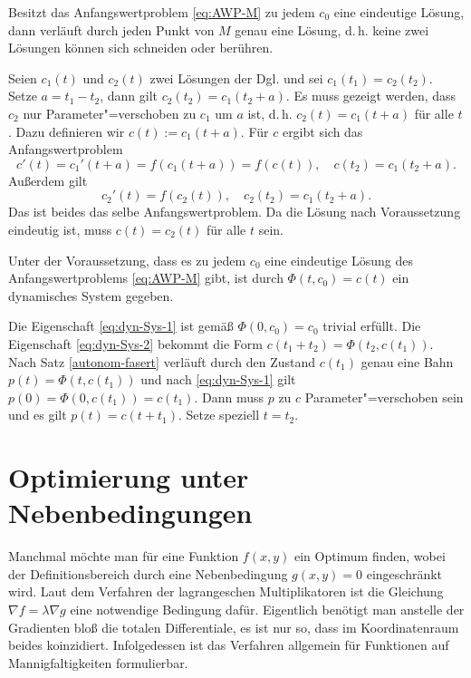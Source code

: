 \begin{theorem}\label{autonom-fasert}
Besitzt das Anfangswertproblem \eqref{eq:AWP-M} zu jedem $c_0$ eine
eindeutige Lösung, dann verläuft durch jeden Punkt von $M$ genau
eine Lösung, d.\,h. keine zwei Lösungen können sich schneiden
oder berühren.
\end{theorem}
\noindent{}
Seien $c_1(t)$ und $c_2(t)$ zwei Lösungen der Dgl. und sei
$c_1(t_1)=c_2(t_2)$. Setze $a=t_1-t_2$, dann gilt $c_2(t_2)=c_1(t_2+a)$.
Es muss gezeigt werden, dass $c_2$ nur Parameter"=verschoben
zu $c_1$ um $a$ ist, d.\,h. $c_2(t)=c_1(t+a)$ für alle $t$. Dazu
definieren wir $c(t):=c_1(t+a)$. Für $c$ ergibt sich das
Anfangswertproblem
\begin{equation}
c'(t) = c_1'(t+a) = f(c_1(t+a)) = f(c(t)),\quad c(t_2)=c_1(t_2+a).
\end{equation}
Außerdem gilt
\begin{equation}
c_2'(t) = f(c_2(t)), \quad c_2(t_2)=c_1(t_2+a).
\end{equation}
Das ist beides das selbe Anfangswertproblem. Da die Lösung nach
Voraussetzung eindeutig ist, muss $c(t)=c_2(t)$
für alle $t$ sein.\;\qedsymbol

\begin{theorem}
Unter der Voraussetzung, dass es zu jedem $c_0$ eine eindeutige
Lösung des Anfangswertproblems \eqref{eq:AWP-M} gibt, ist durch
$\Phi(t,c_0)=c(t)$ ein dynamisches System gegeben.
\end{theorem}
\noindent{}
Die Eigenschaft \eqref{eq:dyn-Sys-1} ist gemäß $\Phi(0,c_0)=c_0$
trivial erfüllt. Die Eigenschaft \eqref{eq:dyn-Sys-2} bekommt
die Form $c(t_1+t_2)=\Phi(t_2,c(t_1))$. Nach Satz
\ref{autonom-fasert} verläuft durch den Zustand $c(t_1)$ genau
eine Bahn $p(t)=\Phi(t,c(t_1))$ und nach \eqref{eq:dyn-Sys-1} gilt
$p(0)=\Phi(0,c(t_1))=c(t_1)$. Dann muss $p$ zu $c$ Parameter"=verschoben
sein und es gilt $p(t)=c(t+t_1)$. Setze speziell $t=t_2$.\;\qedsymbol

\newpage
\section{Optimierung unter Nebenbedingungen}

Manchmal möchte man für eine Funktion $f(x,y)$ ein Optimum finden,
wobei der Definitionsbereich durch eine Nebenbedingung $g(x,y)=0$
eingeschränkt wird. Laut dem Verfahren der lagrangeschen
Multiplikatoren ist die Gleichung $\nabla f = \lambda\nabla g$
eine notwendige Bedingung dafür. Eigentlich benötigt man anstelle
der Gradienten bloß die totalen Differentiale, es ist nur so, dass
im Koordinatenraum beides koinzidiert. Infolgedessen ist das
Verfahren allgemein für Funktionen auf Mannigfaltigkeiten
formulierbar.

